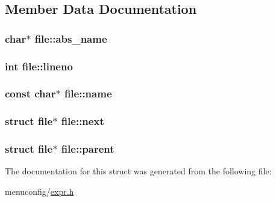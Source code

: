 \subsection{Member Data Documentation}
\hypertarget{structfile_a05031f3fbb25adf39442fca9a3bfb6de}{
\subsubsection[{abs\-\_\-name}]{\setlength{\rightskip}{0pt plus 5cm}char$\ast$ file\-::abs\-\_\-name}}\label{structfile_a05031f3fbb25adf39442fca9a3bfb6de}
\hypertarget{structfile_ae204e048bb7c7079f41fb193872db7d4}{
\subsubsection[{lineno}]{\setlength{\rightskip}{0pt plus 5cm}int file\-::lineno}}\label{structfile_ae204e048bb7c7079f41fb193872db7d4}
\hypertarget{structfile_addc5cbde7b4702bc599665409a7cad54}{
\subsubsection[{name}]{\setlength{\rightskip}{0pt plus 5cm}const char$\ast$ file\-::name}}\label{structfile_addc5cbde7b4702bc599665409a7cad54}
\hypertarget{structfile_a402d6c3ee49f9e34e6d99b62f5d4ea55}{
\subsubsection[{next}]{\setlength{\rightskip}{0pt plus 5cm}struct {\bf file}$\ast$ file\-::next}}\label{structfile_a402d6c3ee49f9e34e6d99b62f5d4ea55}
\hypertarget{structfile_aed2f8d9222a34b7cb8a9bd9a4e70343d}{
\subsubsection[{parent}]{\setlength{\rightskip}{0pt plus 5cm}struct {\bf file}$\ast$ file\-::parent}}\label{structfile_aed2f8d9222a34b7cb8a9bd9a4e70343d}


The documentation for this struct was generated from the following file\-:\begin{DoxyCompactItemize}
\item 
menuconfig/\hyperlink{expr_8h}{expr.\-h}\end{DoxyCompactItemize}
